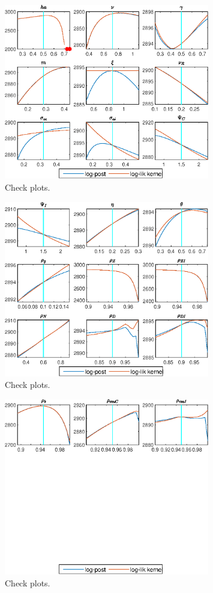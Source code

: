 \begin{figure}[H]
\centering 
\includegraphics[width=0.80\textwidth]{BRS_aggregate/graphs/BRS_aggregate_CheckPlots3}
\caption{Check plots.}\label{Fig:CheckPlots:3}
\end{figure}
 
\begin{figure}[H]
\centering 
\includegraphics[width=0.80\textwidth]{BRS_aggregate/graphs/BRS_aggregate_CheckPlots4}
\caption{Check plots.}\label{Fig:CheckPlots:4}
\end{figure}
 
\begin{figure}[H]
\centering 
\includegraphics[width=0.80\textwidth]{BRS_aggregate/graphs/BRS_aggregate_CheckPlots5}
\caption{Check plots.}\label{Fig:CheckPlots:5}
\end{figure}
 
